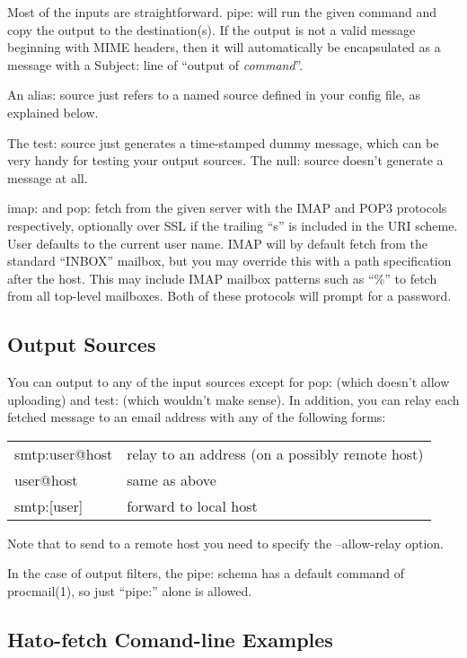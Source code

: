 Most of the inputs are straightforward.  pipe: will run the given
command and copy the output to the destination(s).  If the output is
not a valid message beginning with MIME headers, then it will
automatically be encapsulated as a message with a Subject: line of
``output of {\it command}''.

An alias: source just refers to a named source defined in your config
file, as explained below.

The test: source just generates a time-stamped dummy message, which
can be very handy for testing your output sources.  The null: source
doesn't generate a message at all.

imap: and pop: fetch from the given server with the IMAP and POP3
protocols respectively, optionally over SSL if the trailing ``s'' is
included in the URI scheme.  User defaults to the current user name.
IMAP will by default fetch from the standard ``INBOX'' mailbox, but
you may override this with a path specification after the host.  This
may include IMAP mailbox patterns such as ``\%'' to fetch from all
top-level mailboxes.  Both of these protocols will prompt for a
password.

\subsection{Output Sources}

You can output to any of the input sources except for pop: (which
doesn't allow uploading) and test: (which wouldn't make sense).  In
addition, you can relay each fetched message to an email address with
any of the following forms:

\begin{tabular}{l l}
 smtp:user@host & relay to an address (on a possibly remote host) \\
 user@host      & same as above \\
 smtp:[user]    & forward to local host \\
\end{tabular}

Note that to send to a remote host you need to specify the
--allow-relay option.

In the case of output filters, the pipe: schema has a default command
of procmail(1), so just ``pipe:'' alone is allowed.

\subsection{Hato-fetch Comand-line Examples}

